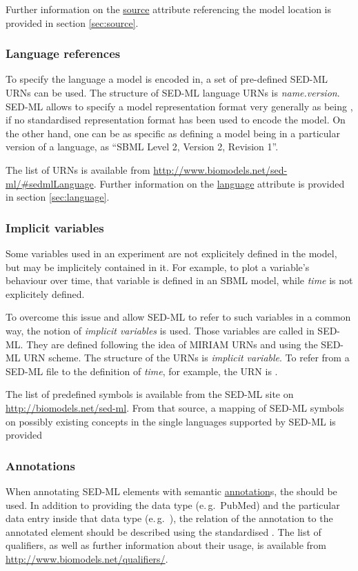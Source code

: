 Further information on the \hyperref[sec:source]{source} attribute referencing the model location is provided in section \ref{sec:source}.

\subsubsection{Language references}
\label{sec:languageURI}
To specify the language a model is encoded in, a set of pre-defined SED-ML URNs can be used. 
The structure of SED-ML language URNs is \emph{name.version}. 
SED-ML allows to specify a model representation format very generally as being , if no standardised representation format has been used to encode the model. On the other hand, one can be as specific as defining
a model being in a particular version of a language, as ``SBML Level 2, Version 2, Revision 1''.

The list of URNs is available from \url{http://www.biomodels.net/sed-ml/#sedmlLanguage}. 
Further information on the \hyperref[sec:language]{language} attribute is provided in section \ref{sec:language}.

\subsubsection{Implicit variables}
\label{sec:implicitVariable}

Some variables used in an experiment are not explicitely defined in the model, but may be implicitely contained in it. 
For example, to plot a variable's behaviour over time, that variable is defined in an SBML model, while \emph{time} is not explicitely defined. 

To overcome this issue and allow SED-ML to refer to such variables in a common way, the notion of \emph{implicit variables} is used.
Those variables are called  in SED-ML. They are defined following the idea of MIRIAM URNs and using the SED-ML URN scheme. The structure of the URNs is \emph{implicit variable}.
To refer from a SED-ML file to the definition of \emph{time}, for example, the URN is .

The list of predefined symbols is available from the SED-ML site on \url{http://biomodels.net/sed-ml}.
From that source, a mapping of SED-ML symbols on possibly existing concepts in the single languages supported by SED-ML is provided

\subsubsection{Annotations}
\label{sec:annotations}
When annotating SED-ML elements with semantic \hyperref[class:annotation]{annotation}s, the  should be used. In addition to providing the data type (e.\,g.\ PubMed) and the particular data entry inside that data type (e.\,g.\ ), the relation of the annotation to the annotated element should be described using the standardised . The list of qualifiers, as well as further information about their usage, is available from \url{http://www.biomodels.net/qualifiers/}.



